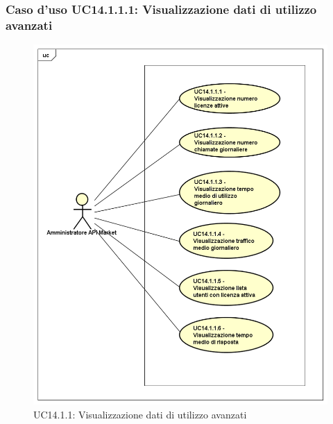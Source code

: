 \subsubsection{Caso d'uso UC14.1.1.1: Visualizzazione dati di utilizzo avanzati}
\label{UC14_1_1_1}
\begin{figure}[ht]
	\centering
	\includegraphics[scale=0.45]{UML/UC14_1_1_1.png}
	\caption{UC14.1.1: Visualizzazione dati di utilizzo avanzati}
\end{figure}

